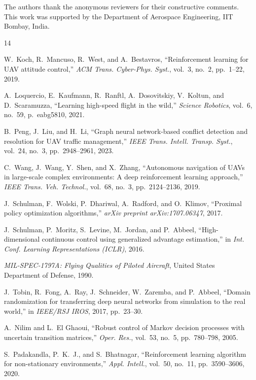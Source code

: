 \documentclass[10pt, conference]{IEEEtran}
\begin{document}
The authors thank the anonymous reviewers for their constructive
comments. This work was supported by the Department of Aerospace
Engineering, IIT Bombay, India.

\begin{thebibliography}{14}

W.~Koch, R.~Mancuso, R.~West, and A.~Bestavros,
``Reinforcement learning for UAV attitude control,''
\textit{ACM Trans. Cyber-Phys. Syst.}, vol.~3, no.~2, pp.~1--22, 2019.

A.~Loquercio, E.~Kaufmann, R.~Ranftl, A.~Dosovitskiy, V.~Koltun, and
D.~Scaramuzza, ``Learning high-speed flight in the wild,''
\textit{Science Robotics}, vol.~6, no.~59, p.~eabg5810, 2021.

B.~Peng, J.~Liu, and H.~Li, ``Graph neural network-based conflict
detection and resolution for UAV traffic management,''
\textit{IEEE Trans. Intell. Transp. Syst.}, vol.~24, no.~3,
pp.~2948--2961, 2023.

C.~Wang, J.~Wang, Y.~Shen, and X.~Zhang, ``Autonomous navigation of
UAVs in large-scale complex environments: A deep reinforcement learning
approach,'' \textit{IEEE Trans. Veh. Technol.}, vol.~68, no.~3,
pp.~2124--2136, 2019.

J.~Schulman, F.~Wolski, P.~Dhariwal, A.~Radford, and O.~Klimov,
``Proximal policy optimization algorithms,'' \textit{arXiv preprint
arXiv:1707.06347}, 2017.

J.~Schulman, P.~Moritz, S.~Levine, M.~Jordan, and P.~Abbeel,
``High-dimensional continuous control using generalized advantage
estimation,'' in \textit{Int. Conf. Learning Representations (ICLR)},
2016.

\textit{MIL-SPEC-1797A: Flying Qualities of Piloted Aircraft},
United States Department of Defense, 1990.

J.~Tobin, R.~Fong, A.~Ray, J.~Schneider, W.~Zaremba, and P.~Abbeel,
``Domain randomization for transferring deep neural networks from
simulation to the real world,'' in \textit{IEEE/RSJ IROS}, 2017,
pp.~23--30.

A.~Nilim and L.~El Ghaoui, ``Robust control of Markov decision processes
with uncertain transition matrices,'' \textit{Oper. Res.}, vol.~53,
no.~5, pp.~780--798, 2005.

S.~Padakandla, P.~K.~J., and S.~Bhatnagar, ``Reinforcement learning
algorithm for non-stationary environments,'' \textit{Appl. Intell.},
vol.~50, no.~11, pp.~3590--3606, 2020.


\end{thebibliography}
\end{document}
